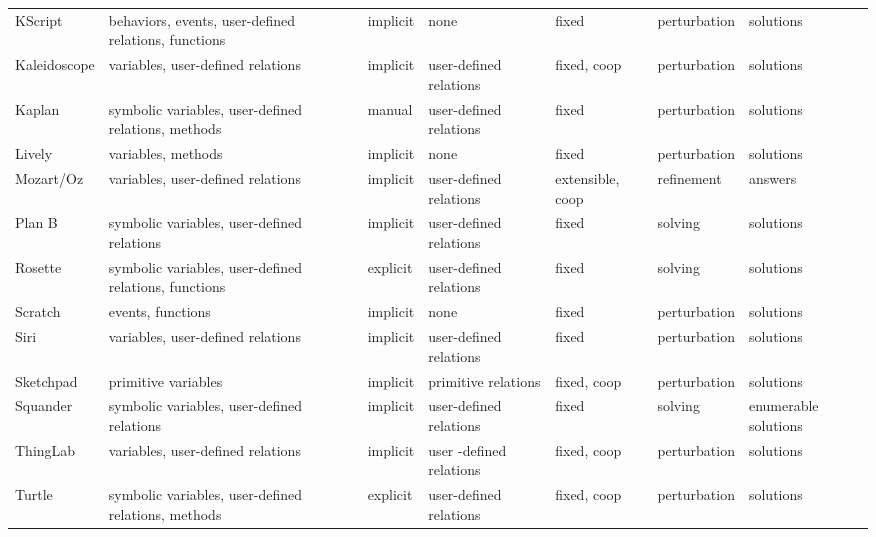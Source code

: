 \begin{table}
\begin{threeparttable}
\begin{tabular}{lllllll}
     \\ 
    KScript & behaviors, events, user-defined relations, functions & implicit & none & fixed & perturbation\tnote{2} & solutions %
     \\ 
    Kaleidoscope & variables, user-defined relations & implicit & user-defined relations & fixed, coop & perturbation\tnote{1} & solutions %
     \\ 
    Kaplan & symbolic variables, user-defined relations, methods & manual & user-defined relations & fixed & perturbation\tnote{4,6} & solutions %
     \\ 
    Lively & variables, methods & implicit & none & fixed & perturbation\tnote{2} & solutions %
     \\ 
    Mozart/Oz & variables, user-defined relations & implicit & user-defined relations & extensible, coop & refinement & answers %
     \\ 
    Plan B & symbolic variables, user-defined relations & implicit & user-defined relations & fixed & solving & solutions %
     \\ 
    Rosette & symbolic variables, user-defined relations, functions & explicit & user-defined relations & fixed & solving & solutions %
     \\ 
    Scratch & events, functions & implicit & none & fixed & perturbation\tnote{2} & solutions %
     \\ 
    Siri & variables, user-defined relations & implicit & user-defined relations & fixed & perturbation\tnote{2} & solutions %
     \\ 
    Sketchpad & primitive variables & implicit & primitive relations & fixed, coop & perturbation\tnote{2} & solutions %
     \\ 
    Squander & symbolic variables, user-defined relations & implicit & user-defined relations & fixed & solving & enumerable solutions %
     \\ 
    ThingLab & variables, user-defined relations & implicit & user -defined relations & fixed, coop & perturbation\tnote{2} & solutions %
     \\ 
    Turtle & symbolic variables, user-defined relations, methods & explicit & user-defined relations & fixed, coop & perturbation\tnote{1,6} & solutions %
    \\\bottomrule                                                                                                                                                             

\end{tabular}
\end{threeparttable}
\end{table}
